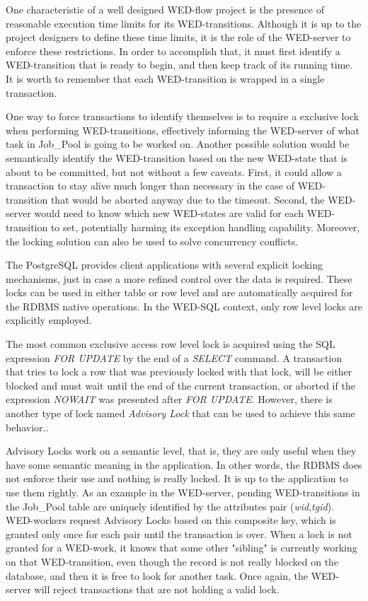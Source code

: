\documentclass[12pt]{article}
\begin{document}
One characteristic of a well designed WED-flow project is the presence of reasonable execution time limits for its WED-transitions. Although it is up to the project designers to define these time limits, it is the role of the WED-server to enforce these restrictions.
In order to accomplish that, it must first identify a WED-transition that is ready  to begin, and then keep track of its running time. It is worth to remember that each WED-transition is wrapped in a single transaction.

One way to force transactions to identify themselves is to require a exclusive lock when performing WED-transitions, effectively informing the WED-server of what task in Job\_Pool is going to be worked on. Another possible solution would be semantically identify the WED-transition based on the new WED-state that is about to be committed, but not without a 
few caveats. First, it could allow a transaction to stay alive much longer than necessary in the case of WED-transition that would be aborted anyway due to the timeout. Second, the WED-server would need to know which new WED-states are valid for each WED-transition to set, potentially harming its exception handling capability. Moreover, the locking solution can also be used to solve concurrency conflicts.    

The PostgreSQL provides client applications with several explicit locking mechanisms, just in case a more refined control over the data is required. These locks can be used in either table or row level and are automatically acquired for the RDBMS native operations. In the WED-SQL context, only row level locks are explicitly employed.  

The most common exclusive access row level lock is acquired using the SQL expression \emph{FOR UPDATE} by the end of a \emph{SELECT} command. A transaction that tries to lock a row that was previously locked with that lock,  will be either blocked and must wait until the end of the current transaction, or aborted if the expression \emph{NOWAIT} was presented after \emph{FOR UPDATE}. However, there is another type of lock named \emph{Advisory Lock} that can be used to achieve this same behavior..

Advisory Locks work on a semantic level, that is, they are only useful when they have some semantic meaning in the  application. In other words, the RDBMS does not enforce their use and nothing is really locked. It is up to the application to use them rightly. As an example in the WED-server, pending WED-transitions in the Job\_Pool table are uniquely identified by the attributes pair (\emph{wid},\emph{tgid}). WED-workers request Advisory Locks based on this composite key, which is granted only once for each pair until the transaction is over. When a lock is not granted for a WED-work, it knows that some other "sibling" is currently working on that WED-transition, even though the record is not really blocked on the database, and then it is free to look for another task. Once again, the WED-server will reject transactions that are not holding a valid lock. 
 
\end{document}
